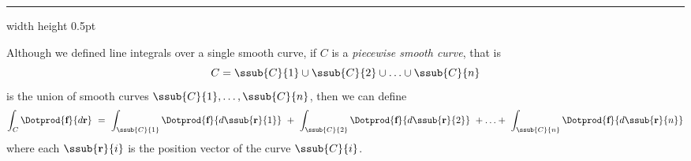 \hrule width \textwidth height 0.5pt
\vspace{3mm}

Although we defined line integrals over a single smooth curve, if $C$ is a \emph{piecewise smooth curve}, that
is
\begin{displaymath}
 C = \ssub{C}{1} \cup \ssub{C}{2} \cup \ldots \cup \ssub{C}{n}
\end{displaymath}
is the union of smooth curves $\ssub{C}{1},\ldots ,\ssub{C}{n}$, then we can define
\begin{displaymath}
 \int_C \Dotprod{\textbf{f}}{d\textbf{r}} ~=~ \int_{\ssub{C}{1}} \Dotprod{\textbf{f}}{d\ssub{\textbf{r}}{1}} ~+~
  \int_{\ssub{C}{2}} \Dotprod{\textbf{f}}{d\ssub{\textbf{r}}{2}} ~+ \ldots +~
  \int_{\ssub{C}{n}} \Dotprod{\textbf{f}}{d\ssub{\textbf{r}}{n}}
\end{displaymath}
where each $\ssub{\textbf{r}}{i}$ is the position vector of the curve $\ssub{C}{i}$.

